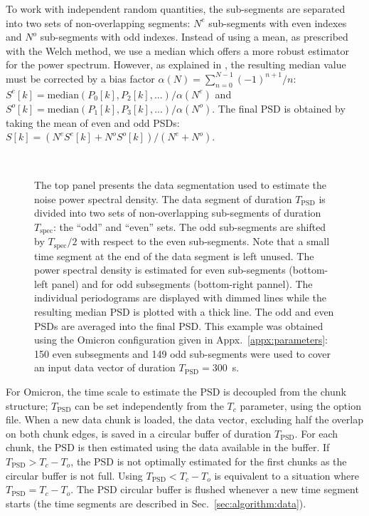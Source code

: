 To work with independent random quantities, the sub-segments are separated into two sets of non-overlapping segments: $N^e$ sub-segments with even indexes and $N^o$ sub-segments with odd indexes. Instead of using a mean, as prescribed with the Welch method, we use a median which offers a more robust estimator for the power spectrum. However, as explained in \cite{Allen:2005fk}, the resulting median value must be corrected by a bias factor $\alpha(N)=\sum_{n=0}^{N-1}{(-1)^{n+1}/n}$: $S^e[k]=\mathrm{median}(P_0[k], P_2[k],...)/\alpha(N^e)$ and $S^o[k]=\mathrm{median}(P_1[k], P_3[k],...)/\alpha(N^o)$. The final PSD is obtained by taking the mean of even and odd PSDs: $S[k]=(N^eS^e[k]+N^oS^o[k])/(N^e+N^o)$.
\begin{figure}
  \center
   \\
  \caption{The top panel presents the data segmentation used to estimate the noise power spectral density. The data segment of duration $T_\mathrm{PSD}$ is divided into two sets of non-overlapping sub-segments of duration $T_\mathrm{spec}$: the ``odd'' and ``even'' sets. The odd sub-segments are shifted by $T_\mathrm{spec}/2$ with respect to the even sub-segments. Note that a small time segment at the end of the data segment is left unused. The power spectral density is estimated for even sub-segments (bottom-left panel) and for odd subsegments (bottom-right pannel). The individual periodograms are displayed with dimmed lines while the resulting median PSD is plotted with a thick line. The odd and even PSDs are averaged into the final PSD. This example was obtained using the Omicron configuration given in Appx.~\ref{appx:parameters}: 150 even subsegments and 149 odd sub-segments were used to cover an input data vector of duration $T_\mathrm{PSD}=300$~s.}
  \label{fig:psdseg}
\end{figure}

For Omicron, the time scale to estimate the PSD is decoupled from the chunk structure; $T_\mathrm{PSD}$ can be set independently from the $T_c$ parameter, using the option file. When a new data chunk is loaded, the data vector, excluding half the overlap on both chunk edges, is saved in a circular buffer of duration $T_\mathrm{PSD}$. For each chunk, the PSD is then estimated using the data available in the buffer. If $T_\mathrm{PSD} > T_c-T_o$, the PSD is not optimally estimated for the first chunks as the circular buffer is not full. Using $T_\mathrm{PSD} < T_c-T_o$ is equivalent to a situation where $T_\mathrm{PSD} = T_c-T_o$. The PSD circular buffer is flushed whenever a new time segment starts (the time segments are described in Sec.~\ref{sec:algorithm:data}). 

